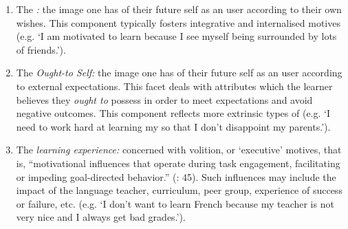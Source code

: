 \documentclass[output=paper]{langsci/langscibook}
\begin{document}
\begin{enumerate}
\item The \textit{:} the image one has of their future self as an  user according to their own wishes. This component typically fosters integrative and internalised motives (e.g. ‘I am motivated to learn  because I see myself being surrounded by lots of  friends.’). 
\item The \textit{Ought-to  Self:} the image one has of their future self as an  user according to external expectations. This facet deals with attributes which the learner believes they \textit{ought to} possess in order to meet expectations and avoid negative outcomes. This component reflects more extrinsic types of  (e.g. ‘I need to work hard at learning my  so that I don’t disappoint my parents.’).
\item The \textit{ learning experience:} concerned with volition, or ‘executive’ motives, that is, “motivational influences that operate during task engagement, facilitating or impeding goal-directed behavior.” (\citealt{DörnyeiOttó1998}: 45). Such influences may include the impact of the language teacher, curriculum, peer group, experience of success or failure, etc. (e.g. ‘I don’t want to learn French because my teacher is not very nice and I always get bad grades.’).

\end{enumerate}
\end{document}
